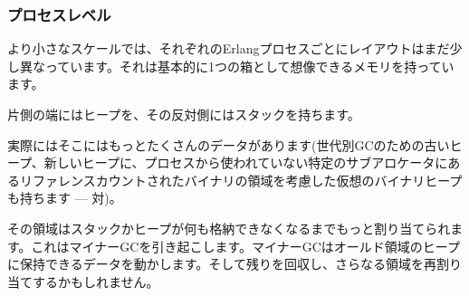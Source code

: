 \subsubsection{プロセスレベル}
\label{subsec:memory-process-level}

より小さなスケールでは、それぞれのErlangプロセスごとにレイアウトはまだ少し異なっています。それは基本的に1つの箱として想像できるメモリを持っています。

\begin{VerbatimText}
[                  ]
\end{VerbatimText}

片側の端にはヒープを、その反対側にはスタックを持ちます。

\begin{VerbatimText}
\end{VerbatimText}

実際にはそこにはもっとたくさんのデータがあります(世代別GCのための古いヒープ、新しいヒープに、プロセスから使われていない特定のサブアロケータにあるリファレンスカウントされたバイナリの領域を考慮した仮想のバイナリヒープも持ちます --- 対)。

\begin{VerbatimText}
\end{VerbatimText}

その領域はスタックかヒープが何も格納できなくなるまでもっと割り当てられます。これはマイナーGCを引き起こします。マイナーGCはオールド領域のヒープに保持できるデータを動かします。そして残りを回収し、さらなる領域を再割り当てするかもしれません。

